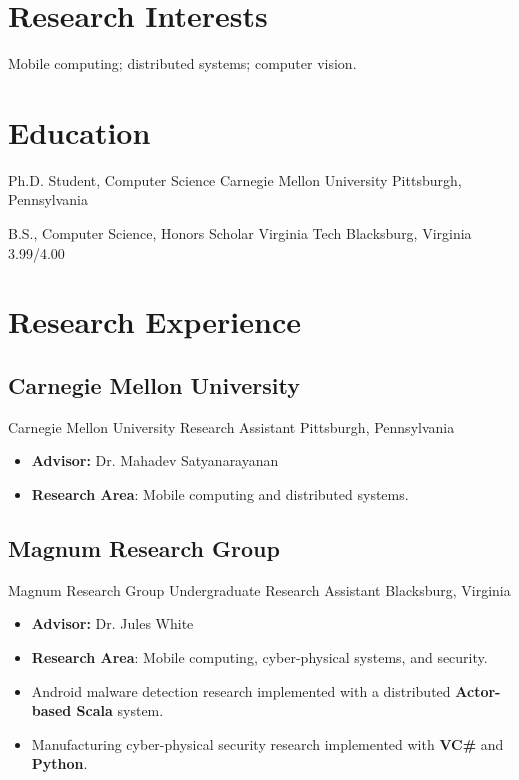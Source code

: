 \documentclass[11pt,letter,sans]{moderncv}
\begin{document}
\makecvtitle

\section{ Research Interests }


  Mobile computing; distributed systems; computer vision.
\section{ Education }


  
      {Ph.D. Student, Computer Science}%
      {Carnegie Mellon University}%
      {Pittsburgh, Pennsylvania}%
      {}%
      {}
  
      {B.S., Computer Science, Honors Scholar}%
      {Virginia Tech}%
      {Blacksburg, Virginia}%
      {3.99/4.00}%
      {}
  
\section{ Research Experience }


  
    \subsection{Carnegie Mellon University}
      {Carnegie Mellon University}%
      {Research Assistant}%
      {Pittsburgh, Pennsylvania}%
      {}%
      {
        \begin{itemize}
        \item {\bf Advisor:} Dr. Mahadev Satyanarayanan\item {\bf Research Area}: Mobile computing and distributed systems.\end{itemize}
      }
  
    \subsection{Magnum Research Group}
      {Magnum Research Group}%
      {Undergraduate Research Assistant}%
      {Blacksburg, Virginia}%
      {}%
      {
        \begin{itemize}
        \item {\bf Advisor:} Dr. Jules White\item {\bf Research Area}: Mobile computing, cyber-physical systems, and security.\item Android malware detection research implemented with a distributed {\bf Actor-based Scala} system.\item Manufacturing cyber-physical security research implemented with {\bf VC\#} and {\bf Python}.\end{itemize}
      }
  
\end{document}
